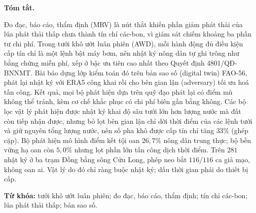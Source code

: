   \vspace{8pt}

  \vspace{4pt}

  \vspace{4pt}

  \vspace{6pt}
  \begin{hujosabstract}
  \noindent\textbf{Tóm tắt.}

 Đo đạc, báo cáo, thẩm định (MRV) là nút thắt khiến phần giảm phát thải của lúa phát thải
 thấp chưa thành tín chỉ các-bon, vì giám sát chiếm khoảng ba phần tư chi
 phí. Trong tưới khô ướt luân phiên (AWD), mỗi hành động đủ điều kiện cấp
 tín chỉ là một lệnh bật máy bơm, nên nhật ký nông dân tự ghi trông như bằng chứng miễn phí,
 xếp ở bậc ưu tiên cao nhất theo Quyết định 4801/QĐ-BNNMT. Bài báo dựng lớp
 kiểm toán đó trên bản sao số (digital twin) FAO-56, phát lại nhật ký với ERA5 công khai rồi cho bên gian lận (adversary) tối ưu hoá tấn công. Kết quả, mọi bộ phát hiện dựa trên quỹ đạo phát lại có điểm mù không thể tránh, kèm cơ chế khắc phục có chi phí biên gần bằng không. Các bộ lọc vật lý phát hiện được nhật ký khai độ sâu tưới lớn hơn lượng nước mà đất
còn tiếp nhận được, nhưng bỏ lọt bên gian lận chỉ dời thời điểm của các lệnh tưới và giữ
nguyên tổng lượng nước, nên số pha khô được cấp tín chỉ tăng $33\%$ (ghép cặp). Bộ phát hiện mô hình điểm
 kết tội oan $26{,}7\%$ nông dân trung thực; bộ bền vững hạ oan còn $5{,}0\%$ nhưng lọt phần
 lớn tấn công dịch thời điểm. Trên $281$ nhật ký ở ba trạm Đồng bằng sông Cửu Long, phép neo
 bắt $116/116$ ca giả mạo, không oan ai. Vật lý do đó chỉ ràng buộc nhật ký; dấu thời gian
 phải do thiết bị cấp.

\noindent\textbf{Từ khóa:} tưới khô ướt luân phiên; đo đạc, báo cáo, thẩm định; tín chỉ
  các-bon; lúa phát thải thấp; bản sao số.

  \vspace{10pt}
  \end{hujosabstract}
\endgroup

